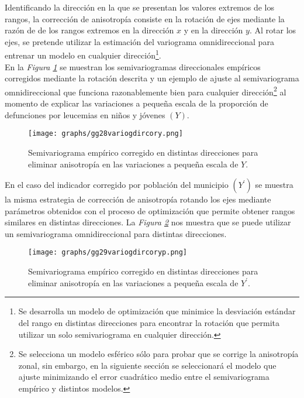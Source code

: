 \documentclass[11pt, oneside]{book}
\begin{document}
Identificando la dirección en la que se presentan los valores extremos de los rangos, la corrección de anisotropía consiste en la rotación de ejes mediante la razón de de los rangos extremos en la dirección $x$ y en la dirección $y$. Al rotar los ejes, se pretende utilizar la estimación del variograma omnidireccional para entrenar un modelo en cualquier dirección\footnote{Se desarrolla un modelo de optimización que minimice la desviación estándar del rango en distintas direcciones para encontrar la rotación que permita utilizar un solo semivariograma en cualquier dirección.}.\\

En la \emph{Figura \ref{fig28.coray}} se muestran los semivariogramas direccionales empíricos corregidos mediante la rotación descrita y un ejemplo de ajuste al semivariograma omnidireccional que funciona razonablemente bien para cualquier dirección\footnote{Se selecciona un modelo esférico sólo para probar que se corrige la anisotropía zonal, sin embargo, en la siguiente sección se seleccionará el modelo que ajuste minimizando el error cuadrático medio entre el semivariograma empírico y distintos modelos.} al momento de explicar las variaciones a pequeña escala de la proporción de defunciones por leucemias en niños y jóvenes $(Y)$.\\

\begin{figure}[!ht]
    \centering
    \texttt{[image: graphs/gg28variogdircory.png]}
  \caption{Semivariograma empírico corregido en distintas direcciones para eliminar anisotropía en las variaciones a pequeña escala de $Y$.}
  \label{fig28.coray}
\end{figure}

En el caso del indicador corregido por población del municipio $(Y^{'})$ se muestra la misma estrategia de corrección de anisotropía rotando los ejes mediante parámetros obtenidos con el proceso de optimización que permite obtener rangos similares en distintas direcciones. La \emph{Figura \ref{fig29.corayp}} nos muestra que se puede utilizar un semivariograma omnidireccional para distintas direcciones.\\

\begin{figure}[!ht]
    \centering
    \texttt{[image: graphs/gg29variogdircoryp.png]}
  \caption{Semivariograma empírico corregido en distintas direcciones para eliminar anisotropía en las variaciones a pequeña escala de $Y^{'}$.}
  \label{fig29.corayp}
\end{figure}
\end{document}
